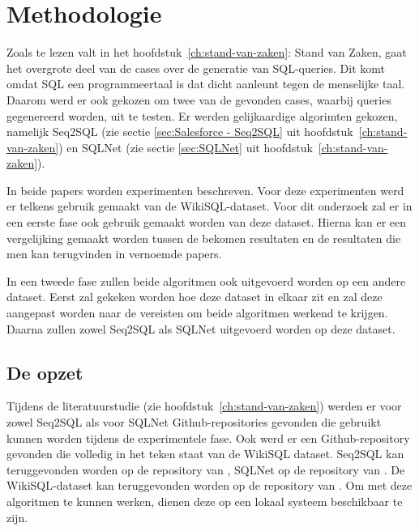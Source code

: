 
\chapter{Methodologie}
\label{ch:methodologie}


Zoals te lezen valt in het hoofdstuk~\ref{ch:stand-van-zaken}: Stand van Zaken, gaat het overgrote deel van de cases over de generatie van SQL-queries. Dit komt omdat SQL een programmeertaal is dat dicht aanleunt tegen de menselijke taal. Daarom werd er ook gekozen om twee van de gevonden cases, waarbij queries gegenereerd worden, uit te testen. Er werden gelijkaardige algorimten gekozen, namelijk Seq2SQL (zie sectie \ref{sec:Salesforce - Seq2SQL} uit hoofdstuk~\ref{ch:stand-van-zaken}) en SQLNet (zie sectie \ref{sec:SQLNet} uit hoofdstuk~\ref{ch:stand-van-zaken}).

In beide papers worden experimenten beschreven. Voor deze experimenten werd er telkens gebruik gemaakt van de WikiSQL-dataset. Voor dit onderzoek zal er in een eerste fase ook gebruik gemaakt worden van deze dataset. Hierna kan er een vergelijking gemaakt worden tussen de bekomen resultaten en de resultaten die men kan terugvinden in vernoemde papers. 

In een tweede fase zullen beide algoritmen ook uitgevoerd worden op een andere dataset. Eerst zal gekeken worden hoe deze dataset in elkaar zit en zal deze aangepast worden naar de vereisten om beide algoritmen werkend te krijgen. Daarna zullen zowel Seq2SQL als SQLNet uitgevoerd worden op deze dataset. 

\section{De opzet}
\label{sec:opzet}

Tijdens de literatuurstudie (zie hoofdstuk~\ref{ch:stand-van-zaken}) werden er voor zowel Seq2SQL als voor SQLNet Github-repositories gevonden die gebruikt kunnen worden tijdens de experimentele fase. Ook werd er een Github-repository gevonden die volledig in het teken staat van de WikiSQL dataset. Seq2SQL kan teruggevonden worden op de repository van \textcite{seq2sql}, SQLNet op de repository van \textcite{sqlnet}. De WikiSQL-dataset kan teruggevonden worden op de repository van \textcite{wikisql}. Om met deze algoritmen te kunnen werken, dienen deze op een lokaal systeem beschikbaar te zijn. 

